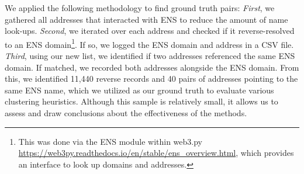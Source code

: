 \documentclass[12pt,a4paper,titlepage,oneside,english]{article}
\begin{document}
We applied the following methodology to find ground truth pairs: \textit{First}, we gathered all addresses that interacted with ENS to reduce the amount of name look-ups. \textit{Second}, we iterated over each address and checked if it reverse-resolved to an ENS domain\footnote{This was done via the ENS module within web3.py \url{https://web3py.readthedocs.io/en/stable/ens_overview.html}, which provides an interface to look up domains and addresses.}. If so, we logged the ENS domain and address in a CSV file. \textit{Third}, using our new list, we identified if two addresses referenced the same ENS domain. If matched, we recorded both addresses alongside the ENS domain. \newline
From this, we identified 11,440 reverse records and 40 pairs of addresses pointing to the same ENS name, which we utilized as our ground truth to evaluate various clustering heuristics. Although this sample is relatively small, it allows us to assess and draw conclusions about the effectiveness of the methods.

\end{document}
